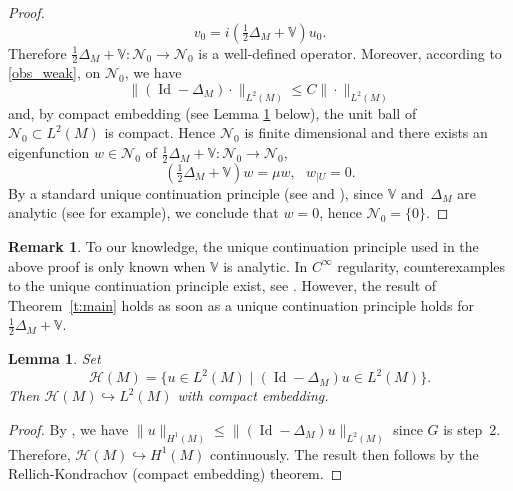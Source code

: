 \documentclass[10pt]{amsart}
\let\mathcal\mathscr
\let\sep\mid
\DeclareMathOperator{\Id}{Id}
\theoremstyle{plain}
\newtheorem{lemma}[theorem]{Lemma}
\theoremstyle{definition}
\newtheorem{remark}[theorem]{Remark}
\def\bbV{{\mathbb V}}
\begin{document}
\begin{proof}
\begin{equation*}
v_0=i(\tfrac{1}{2}\Delta_M+\bbV) u_0.
\end{equation*}
Therefore $\frac{1}{2}\Delta_M+\bbV:\mathcal{N}_0\to \mathcal{N}_0$ is a well-defined operator. Moreover, according to \eqref{obs_weak}, on $\mathcal{N}_0$, we have
\begin{equation*}
\|(\Id-\Delta_M)\cdot\|_{L^2(M)}\leq C\|\cdot\|_{L^2(M)}
\end{equation*}
and, by compact embedding (see Lemma \ref{l:compact} below), the unit ball of $\mathcal{N}_0\subset L^2(M)$ is compact. Hence $\mathcal{N}_0$ is finite dimensional and there exists an eigenfunction $w\in\mathcal{N}_0$ of $\tfrac12\Delta_M+\bbV:\mathcal{N}_0\to \mathcal{N}_0$, \ie \begin{equation*}
(\tfrac12\Delta_M+\bbV)w=\mu w, \ \ \ w_{|U}=0.
\end{equation*}
By a standard unique continuation principle (see \cite{Bon69} and \cite[Th.\,1.12]{Laur}), since $\bbV$ and~$\Delta_M$ are analytic (see \cite[\S 5.10]{BLU} for example), we conclude that $w=0$, hence $\mathcal{N}_0=\{0\}$.
\end{proof}
\begin{remark}\label{rem:analyticity}
To our knowledge, the unique continuation principle used in the above proof is only known when $\bbV$ is analytic. In $C^\infty$ regularity, counterexamples to the unique continuation principle exist, see \cite{Ba}. However, the result of Theorem~\ref{t:main} holds as soon as a unique continuation principle holds for~$\frac12\Delta_M+\bbV$.
\end{remark}

\begin{lemma} \label{l:compact}
Set
\begin{equation*}
\mathcal{H}(M)=\{u\in L^2(M) \sep (\Id-\Delta_M)u \in L^2(M)\}.
\end{equation*}
Then $\mathcal{H}(M)\hookrightarrow L^2(M)$ with compact embedding.
\end{lemma}
\begin{proof}
By \cite[Cor.\,B.1]{Laur}, we have $\|u\|_{H^1(M)}\leq \|(\Id-\Delta_M)u\|_{L^2(M)}$ since $G$ is step~2. Therefore, $\mathcal{H}(M)\hookrightarrow H^1(M)$ continuously. The result then follows by the Rellich-Kondrachov (compact embedding) theorem.
\end{proof}
\end{document}
